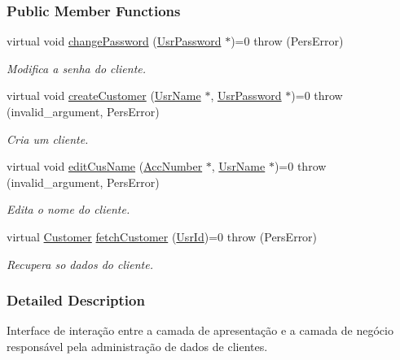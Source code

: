 \subsubsection*{Public Member Functions}
\begin{DoxyCompactItemize}
\item 
virtual void \hyperlink{classUserCusAdm_aa78ba1b0eb4f14ca68f8ef2318e9c3d1}{change\-Password} (\hyperlink{classUsrPassword}{Usr\-Password} $\ast$)=0  throw (\-Pers\-Error)
\begin{DoxyCompactList}\small\item\em Modifica a senha do cliente. \end{DoxyCompactList}\item 
virtual void \hyperlink{classUserCusAdm_afc190444ef3834236b8057bc876ee106}{create\-Customer} (\hyperlink{classUsrName}{Usr\-Name} $\ast$, \hyperlink{classUsrPassword}{Usr\-Password} $\ast$)=0  throw (invalid\-\_\-argument, Pers\-Error)
\begin{DoxyCompactList}\small\item\em Cria um cliente. \end{DoxyCompactList}\item 
virtual void \hyperlink{classUserCusAdm_a6105bcc548efb475bae0bc36b58743a2}{edit\-Cus\-Name} (\hyperlink{classAccNumber}{Acc\-Number} $\ast$, \hyperlink{classUsrName}{Usr\-Name} $\ast$)=0  throw (invalid\-\_\-argument, Pers\-Error)
\begin{DoxyCompactList}\small\item\em Edita o nome do cliente. \end{DoxyCompactList}\item 
virtual \hyperlink{classCustomer}{Customer} \hyperlink{classUserCusAdm_a8a67bf25c965e931be912f33449e0f8a}{fetch\-Customer} (\hyperlink{classUsrId}{Usr\-Id})=0  throw (\-Pers\-Error)
\begin{DoxyCompactList}\small\item\em Recupera so dados do cliente. \end{DoxyCompactList}\end{DoxyCompactItemize}


\subsubsection{Detailed Description}
Interface de interação entre a camada de apresentação e a camada de negócio responsável pela administração de dados de clientes. 



